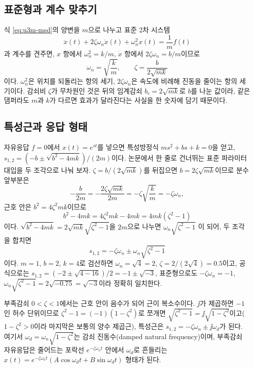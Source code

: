 \subsection{표준형과 계수 맞추기}

식 \eqref{eq:u3m-msd}의 양변을 $m$으로 나누고 표준 2차 시스템
\begin{equation}
  \ddot{x}(t)+2\zeta\omega_n\dot{x}(t)+\omega_n^2 x(t)=\frac{1}{m}f(t)
  \label{eq:u3m-standard}
\end{equation}
과 계수를 견주면, $x$ 항에서 $\omega_n^2=k/m$, $\dot{x}$ 항에서 $2\zeta\omega_n=b/m$이므로
\begin{equation}
  \omega_n=\sqrt{\frac{k}{m}}, \qquad \zeta=\frac{b}{2\sqrt{mk}}
\end{equation}
이다.
$\omega_n^2$은 위치를 되돌리는 항의 세기, $2\zeta\omega_n$은 속도에 비례해 진동을 줄이는
항의 세기이다.
감쇠비 $\zeta$가 무차원인 것은 뒤의 임계감쇠 $b_c=2\sqrt{mk}$로 $b$를 나눈 값이라,
같은 댐퍼라도 $m$과 $k$가 다르면 효과가 달라진다는 사실을 한 숫자에 담기 때문이다.

\subsection{특성근과 응답 형태}

자유응답 $f=0$에서 $x(t)=e^{st}$를 넣으면 특성방정식 $ms^2+bs+k=0$을 얻고,
$s_{1,2}=(-b\pm\sqrt{b^2-4mk})/(2m)$이다.
논문에서 한 줄로 건너뛰는 표준 파라미터 대입을 두 조각으로 나눠 보자.
$\zeta=b/(2\sqrt{mk})$를 뒤집으면 $b=2\zeta\sqrt{mk}$이므로 분수 앞부분은
\begin{equation}
  -\frac{b}{2m}=-\frac{2\zeta\sqrt{mk}}{2m}=-\zeta\sqrt{\frac{k}{m}}=-\zeta\omega_n,
\end{equation}
근호 안은 $b^2=4\zeta^2 mk$이므로
\begin{equation}
  b^2-4mk=4\zeta^2 mk-4mk=4mk(\zeta^2-1)
\end{equation}
이다.
$\sqrt{b^2-4mk}=2\sqrt{mk}\sqrt{\zeta^2-1}$을 $2m$으로 나누면 $\omega_n\sqrt{\zeta^2-1}$
이 되어, 두 조각을 합치면
\begin{equation}
  s_{1,2}=-\zeta\omega_n\pm\omega_n\sqrt{\zeta^2-1}
  \label{eq:u3m-roots}
\end{equation}
이다.
$m=1$, $b=2$, $k=4$로 검산하면 $\omega_n=\sqrt{4}=2$, $\zeta=2/(2\sqrt{4})=0.5$이고,
공식으로는 $s_{1,2}=(-2\pm\sqrt{4-16})/2=-1\pm\sqrt{-3}$, 표준형으로도 $-\zeta\omega_n=-1$,
$\omega_n\sqrt{\zeta^2-1}=2\sqrt{-0.75}=\sqrt{-3}$이라 정확히 일치한다.

부족감쇠 $0<\zeta<1$에서는 근호 안이 음수가 되어 근이 복소수이다.
$\jj$가 제곱하면 $-1$인 허수 단위이므로 $\zeta^2-1=(-1)(1-\zeta^2)$로 쪼개면
$\sqrt{\zeta^2-1}=\jj\sqrt{1-\zeta^2}$이고($1-\zeta^2>0$이라 마지막은 보통의 양수 제곱근),
특성근은 $s_{1,2}=-\zeta\omega_n\pm\jj\omega_d$가 된다.
여기서 $\omega_d=\omega_n\sqrt{1-\zeta^2}$는 감쇠 진동수(damped natural frequency)이며,
부족감쇠 자유응답은 줄어드는 포락선 $e^{-\zeta\omega_n t}$ 안에서 $\omega_d$로 흔들리는
$x(t)=e^{-\zeta\omega_n t}(A\cos\omega_d t+B\sin\omega_d t)$ 형태가 된다.

